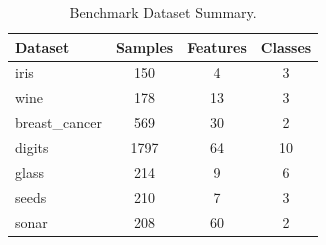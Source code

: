 \begin{table}[ht]
\centering
\caption{Benchmark Dataset Summary.}
\label{tab:datasets}
\begin{tabular}{lccc}
\toprule
Dataset & Samples & Features & Classes \\
\midrule
iris & 150 & 4 & 3 \\
wine & 178 & 13 & 3 \\
breast_cancer & 569 & 30 & 2 \\
digits & 1797 & 64 & 10 \\
glass & 214 & 9 & 6 \\
seeds & 210 & 7 & 3 \\
sonar & 208 & 60 & 2 \\
\bottomrule
\end{tabular}
\end{table}

